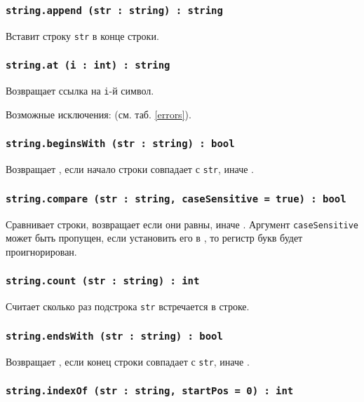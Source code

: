 \subsubsection{\texttt{string.append (str : string) : string}}

Вставит строку \texttt{str} в конце строки.

\subsubsection{\texttt{string.at (i : int) : string}}

Возвращает ссылка на \texttt{i}-й символ.

Возможные исключения:  (см. таб. \ref{errors}).

\subsubsection{\texttt{string.beginsWith (str : string) : bool}}

Возвращает \true{}, если начало строки совпадает с \texttt{str}, иначе \false{}.

\subsubsection{\texttt{string.compare (str : string, caseSensitive = true) : bool}}

Сравнивает строки, возвращает \true{} если они равны, иначе \false{}. Аргумент \texttt{caseSensitive} может быть пропущен, если установить его в \false{}, то регистр букв будет проигнорирован.

\subsubsection{\texttt{string.count (str : string) : int}}

Считает сколько раз подстрока \texttt{str} встречается в строке.

\subsubsection{\texttt{string.endsWith (str : string) : bool}}

Возвращает \true{}, если конец строки совпадает с \texttt{str}, иначе \false{}.

\subsubsection{\texttt{string.indexOf (str : string, startPos = 0) : int}}

